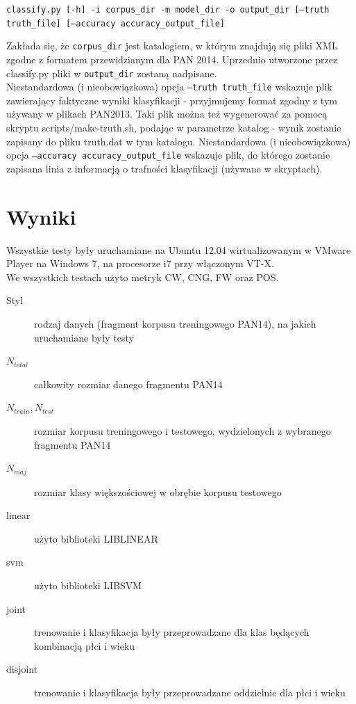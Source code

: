 \documentclass{article}
\begin{document}
\texttt{classify.py [-h] -i corpus\_dir -m model\_dir -o output\_dir  [--truth truth\_file] [--accuracy accuracy\_output\_file]}

Zakłada się, że \texttt{corpus\_dir} jest katalogiem, w którym znajdują się pliki XML zgodne z formatem przewidzianym dla PAN 2014. Uprzednio utworzone przez classify.py pliki w \texttt{output\_dir} zostaną nadpisane. \\
Niestandardowa (i nieobowiązkowa) opcja \texttt{--truth truth\_file} wskazuje plik zawierający faktyczne wyniki klasyfikacji - przyjmujemy format zgodny z tym używany w plikach PAN2013. Taki plik można też wygenerować za pomocą skryptu scripts/make-truth.sh, podając w parametrze katalog - wynik zostanie zapisany do pliku truth.dat w tym katalogu.
Niestandardowa (i nieobowiązkowa) opcja \texttt{--accuracy accuracy\_output\_file} wskazuje plik, do którego zostanie zapisana linia z informacją o trafności klasyfikacji (używane w skryptach).


\section{Wyniki}

Wszystkie testy były uruchamiane na Ubuntu 12.04 wirtualizowanym w VMware Player na Windows 7, na procesorze i7 przy włączonym VT-X. \\

We wszystkich testach użyto metryk CW, CNG, FW oraz POS. \\

\begin{description}

\item[Styl] rodzaj danych (fragment korpusu treningowego PAN14), na jakich uruchamiane były testy \\

\item[$N_{total}$] całkowity rozmiar danego fragmentu PAN14
\item[$N_{train}, N_{test}$] rozmiar korpusu treningowego i testowego, wydzielonych z wybranego fragmentu PAN14
\item[$N_{maj}$] rozmiar klasy większościowej w obrębie korpusu testowego \\

\item[linear] użyto biblioteki LIBLINEAR
\item[svm] użyto biblioteki LIBSVM
\item[joint] trenowanie i klasyfikacja były przeprowadzane dla klas będących kombinacją płci i wieku
\item[disjoint] trenowanie i klasyfikacja były przeprowadzane oddzielnie dla płci i wieku \\

\end{description}
\end{document}

